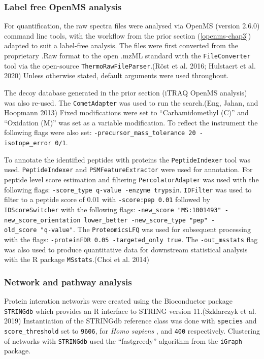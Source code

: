 \documentclass[9pt,lineno]{elife}
\begin{document}
\hypertarget{openms-label-free}{%
\subsubsection{Label free OpenMS analysis}\label{openms-label-free}}

For quantification, the raw spectra files were analysed via OpenMS (version 2.6.0) command line tools, with the workflow from the prior section (\ref{openms-chap3}) adapted to suit a label-free analysis.
The files were first converted from the proprietary .Raw format to the open .mzML standard with the \texttt{FileConverter} tool via the open-source \texttt{ThermoRawFileParser}.(Röst et al. 2016; Hulstaert et al. 2020)
Unless otherwise stated, default arguments were used throughout.

The decoy database generated in the prior section (iTRAQ OpenMS analysis) was also re-used.
The \texttt{CometAdapter} was used to run the search.(Eng, Jahan, and Hoopmann 2013)
Fixed modifications were set to ``Carbamidomethyl (C)'' and ``Oxidation (M)'' was set as a variable modification.
To reflect the instrument the following flags were also set: \texttt{-precursor\_mass\_tolerance\ 20\ -isotope\_error\ 0/1}.

To annotate the identified peptides with proteins the \texttt{PeptideIndexer} tool was used.
\texttt{PeptideIndexer} and \texttt{PSMFeatureExtractor} were used for annotation.
For peptide level score estimation and filtering \texttt{PercolatorAdapter} was used with the following flags: \texttt{-score\_type\ q-value\ -enzyme\ trypsin}.
\texttt{IDFilter} was used to filter to a peptide score of 0.01 with \texttt{-score:pep\ 0.01} followed by \texttt{IDScoreSwitcher} with the following flags: \texttt{-new\_score\ "MS:1001493"\ -new\_score\_orientation\ lower\_better\ -new\_score\_type\ "pep"\ -old\_score\ "q-value"}.
The \texttt{ProteomicsLFQ} was used for subsequent processing with the flags: \texttt{-proteinFDR\ 0.05\ -targeted\_only\ true}.
The \texttt{-out\_msstats} flag was also used to produce quantitative data for downstream statistical analysis with the R package \texttt{MSstats}.(Choi et al. 2014)

\hypertarget{pathway-analysis-chap3}{%
\subsubsection{Network and pathway analysis}\label{pathway-analysis-chap3}}

Protein interation networks were created using the Bioconductor package \texttt{STRINGdb} which provides an R interface to STRING version 11.(Szklarczyk et al. 2019)
Instantiation of the STRINGdb reference class was done with \texttt{species} and \texttt{score\_threshold} set to \texttt{9606}, for \emph{Homo sapiens} , and \texttt{400} respectively.
Clustering of networks with \texttt{STRINGdb} used the ``fastgreedy'' algorithm from the \texttt{iGraph} package.
\end{document}

